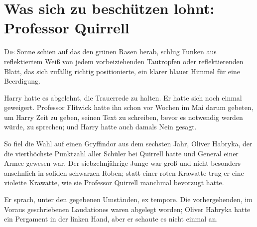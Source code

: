 \chapter{Was sich zu beschützen lohnt: Professor Quirrell}

\lettrine{D}{ie} Sonne schien auf das den grünen Rasen herab, schlug Funken aus reflektiertem Weiß von jedem vorbeiziehenden Tautropfen oder reflektierenden Blatt, das sich zufällig richtig positionierte, ein klarer blauer Himmel für eine Beerdigung.

Harry hatte es abgelehnt, die Trauerrede zu halten. Er hatte sich noch einmal geweigert. Professor Flitwick hatte ihn schon vor Wochen im Mai darum gebeten, um Harry Zeit zu geben, seinen Text zu schreiben, bevor es notwendig werden würde, zu sprechen; und Harry hatte auch damals Nein gesagt.

So fiel die Wahl auf einen Gryffindor aus dem sechsten Jahr, Oliver Habryka, der die vierthöchste Punktzahl aller Schüler bei Quirrell hatte und General einer Armee gewesen war. Der siebzehnjährige Junge war groß und nicht besonders ansehnlich in soliden schwarzen Roben; statt einer roten Krawatte trug er eine violette Krawatte, wie sie Professor Quirrell manchmal bevorzugt hatte.

Er sprach, unter den gegebenen Umständen, ex tempore. Die vorhergehenden, im Voraus geschriebenen Laudationes waren abgelegt worden; Oliver Habryka hatte ein Pergament in der linken Hand, aber er schaute es nicht einmal an.

